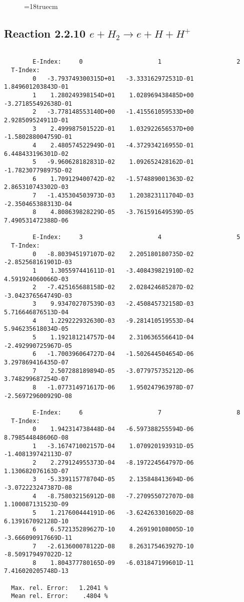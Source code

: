 \begin{figure} \label{2.2.9}
\epsfxsize=18truecm
\end{figure}
\newpage

\subsection{
Reaction 2.2.10  $ e + H_2  \rightarrow e + H + H^+  $
}

\begin{verbatim}

        E-Index:     0                     1                     2
  T-Index:
        0   -3.793749300315D+01   -3.333162972531D-01    1.849601203843D-01
        1    1.280249398154D+01    1.028969438485D+00   -3.271855492638D-01
        2   -3.778148553140D+00   -1.415561059533D+00    2.928509524911D-01
        3    2.499987501522D-01    1.032922656537D+00   -1.580288004759D-01
        4    2.480574522949D-01   -4.372934216955D-01    6.448433196301D-02
        5   -9.960628182831D-02    1.092652428162D-01   -1.782307798975D-02
        6    1.709129400742D-02   -1.574889001363D-02    2.865310743302D-03
        7   -1.435304503973D-03    1.203823111704D-03   -2.350465388313D-04
        8    4.808639828229D-05   -3.761591649539D-05    7.490531472388D-06

        E-Index:     3                     4                     5
  T-Index:
        0   -8.803945197107D-02    2.205180180735D-02   -2.852568161901D-03
        1    1.305597441611D-01   -3.408439821910D-02    4.591924060066D-03
        2   -7.425165688158D-02    2.028424685287D-02   -3.042376564749D-03
        3    9.934702707539D-03   -2.450845732158D-03    5.716646876513D-04
        4    1.229222932630D-03   -9.281410519553D-04    5.946235618034D-05
        5    1.192181214757D-04    2.310636556641D-04   -2.492990725967D-05
        6   -1.700396064727D-04   -1.502644504654D-06    3.297869416435D-07
        7    2.507288189894D-05   -3.077975735212D-06    3.748299687254D-07
        8   -1.077314971617D-06    1.950247963978D-07   -2.569729600929D-08

        E-Index:     6                     7                     8
  T-Index:
        0    1.942314738448D-04   -6.597388255594D-06    8.798544848606D-08
        1   -3.167471002157D-04    1.070920193931D-05   -1.408139742113D-07
        2    2.279124955373D-04   -8.197224564797D-06    1.130682076163D-07
        3   -5.339115778704D-05    2.135848413694D-06   -3.072223247387D-08
        4   -8.758032156912D-08   -7.270955072707D-08    1.100087131523D-09
        5    1.217600444191D-06   -3.624263301602D-08    6.139167092128D-10
        6    6.572135289627D-10    4.269190108005D-10   -3.666090917669D-11
        7   -2.613600078122D-08    8.263175463927D-10   -8.509179497022D-12
        8    1.804377780165D-09   -6.031847199601D-11    7.416020205748D-13

  Max. rel. Error:   1.2041 %
  Mean rel. Error:    .4804 %
\end{verbatim}

